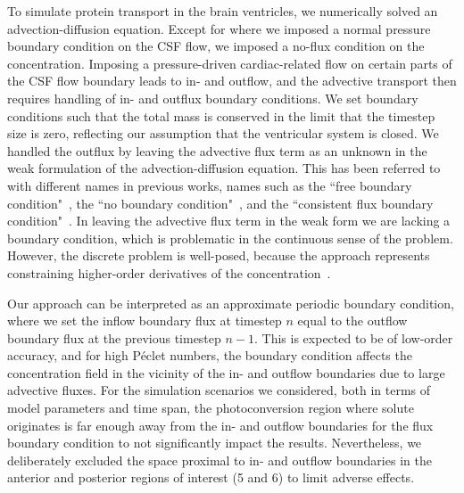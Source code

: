 \documentclass{WileyMSP-template}
\begin{document}
To simulate protein transport in the brain ventricles, we numerically solved
an advection-diffusion equation. Except for where we imposed a normal pressure
boundary condition on the CSF flow,
we imposed a no-flux condition on the concentration. Imposing a pressure-driven
cardiac-related flow on certain parts of the CSF flow boundary leads to in- and outflow,
and the advective transport then requires handling of in- and outflux boundary conditions.
We set boundary conditions such that the total mass is conserved in the
limit that the timestep size is zero, reflecting our assumption that the
ventricular system is closed.
We handled the outflux by leaving the advective flux term as an unknown in the weak formulation
of the advection-diffusion equation. This has been referred to with different names
in previous works, names such as the ``free boundary condition"~\cite{Papanastasiou1992ACondition},
the ``no boundary condition"~\cite{Griffiths1997TheCondition}, and the 
``consistent flux boundary condition"~\cite{Lynch2020NumericalHemodynamics}. 
In leaving the advective flux term in the weak form we are lacking a boundary condition,
which is problematic in the continuous sense of the problem.
However, the discrete problem is well-posed, because the approach represents
constraining higher-order derivatives of the concentration~\cite{Griffiths1997TheCondition}. 

Our approach can be interpreted as an approximate periodic boundary condition, where we set
the inflow boundary flux at timestep $n$ equal to the outflow boundary flux at the previous
timestep $n-1$. This is expected to be of low-order accuracy, and for high Péclet numbers,
the boundary condition affects the concentration field in the vicinity of the
in- and outflow boundaries
due to large advective fluxes. For the simulation scenarios we considered,
both in terms of model parameters
and time span, the photoconversion region where solute originates
is far enough away from the in- and outflow
boundaries for the flux boundary condition to not significantly impact the results. Nevertheless,
we deliberately excluded the space proximal to in- and outflow boundaries in
the anterior and posterior regions of interest (5 and 6) to limit adverse effects. 
\end{document}
